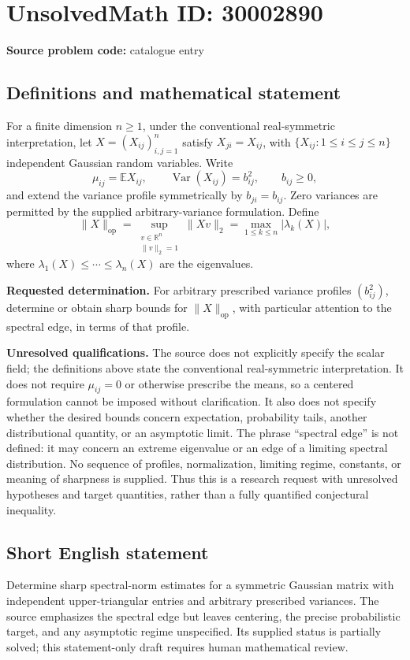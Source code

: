 \documentclass[11pt]{article}
\newcommand{\R}{\mathbb{R}}
\newcommand{\E}{\mathbb{E}}
\begin{document}
\section*{UnsolvedMath ID: 30002890}
\textbf{Source problem code:} catalogue entry
\subsection{Definitions and mathematical statement}
For a finite dimension \(n\geq 1\), under the conventional real-symmetric interpretation, let \(X=(X_{ij})_{i,j=1}^{n}\) satisfy \(X_{ji}=X_{ij}\), with \(\{X_{ij}:1\leq i\leq j\leq n\}\) independent Gaussian random variables. Write
\[
\mu_{ij}=\E X_{ij},\qquad \operatorname{Var}(X_{ij})=b_{ij}^{2},\qquad b_{ij}\geq 0,
\]
and extend the variance profile symmetrically by \(b_{ji}=b_{ij}\). Zero variances are permitted by the supplied arbitrary-variance formulation. Define
\[
\|X\|_{\mathrm{op}}=\sup_{\substack{v\in\R^n\\ \|v\|_2=1}}\|Xv\|_2
=\max_{1\leq k\leq n}|\lambda_k(X)|,
\]
where \(\lambda_1(X)\leq\cdots\leq\lambda_n(X)\) are the eigenvalues.

\textbf{Requested determination.} For arbitrary prescribed variance profiles \((b_{ij}^{2})\), determine or obtain sharp bounds for \(\|X\|_{\mathrm{op}}\), with particular attention to the spectral edge, in terms of that profile.

\textbf{Unresolved qualifications.} The source does not explicitly specify the scalar field; the definitions above state the conventional real-symmetric interpretation. It does not require \(\mu_{ij}=0\) or otherwise prescribe the means, so a centered formulation cannot be imposed without clarification. It also does not specify whether the desired bounds concern expectation, probability tails, another distributional quantity, or an asymptotic limit. The phrase ``spectral edge'' is not defined: it may concern an extreme eigenvalue or an edge of a limiting spectral distribution. No sequence of profiles, normalization, limiting regime, constants, or meaning of sharpness is supplied. Thus this is a research request with unresolved hypotheses and target quantities, rather than a fully quantified conjectural inequality.
\subsection{Short English statement}
Determine sharp spectral-norm estimates for a symmetric Gaussian matrix with independent upper-triangular entries and arbitrary prescribed variances. The source emphasizes the spectral edge but leaves centering, the precise probabilistic target, and any asymptotic regime unspecified. Its supplied status is partially solved; this statement-only draft requires human mathematical review.
\end{document}
